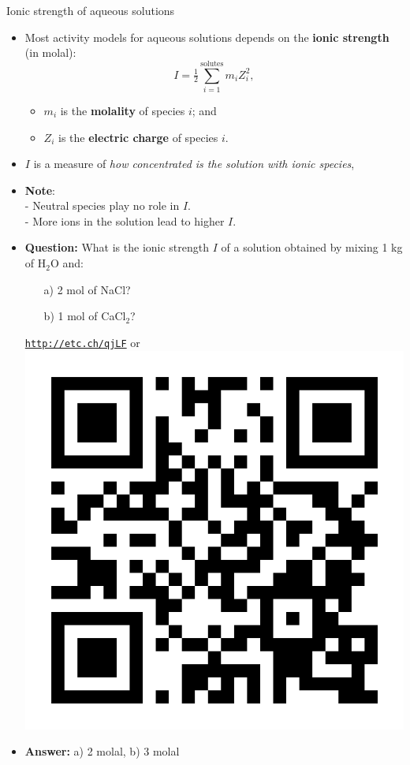 \begin{frame}{Ionic strength of aqueous solutions}
%
\lcol
\begin{itemize}
\item Most activity models for aqueous solutions depends on the  \alert{\textbf{ionic strength}} (in molal):
\[
\boxed{I=\tfrac{1}{2}\sum_{i=1}^{\text{solutes}}m_{i}Z_{i}^{2}},
\]
\begin{itemize}
\item $m_{i}$ is the \textbf{molality} of species $i$; and
\item $Z_{i}$ is the \textbf{electric charge }of species $i$.
\end{itemize}
\pause
\item $I$ is a measure of \emph{how concentrated is the solution with ionic
species}, 
\item \textbf{Note}: \\
\quad - \alert{Neutral species} play no role in $I$.\\
\quad - \alert{More ions} in the solution lead to higher $I$.\\
\end{itemize}
\rcol
\begin{itemize}
	\pause
\item \alert{\textbf{Question:}} What is the ionic strength $I$ of a solution obtained
by mixing 1 kg of H$_{2}$O and:
\begin{itemize}
\item[a)] 2 mol of NaCl?
\item[b)] 1 mol of CaCl$_{2}$?
\end{itemize}
\vskip 5pt
\begin{center}
\href{http://etc.ch/qjLF}{\textcolor{indigo(dye)}{\tt http://etc.ch/qjLF}} or 
\includegraphics[height=0.45\columnwidth]{figures/activity-models/poll-ionic-strength.png}
\end{center}
\hiddenpause
\item \textbf{Answer:}
a) 2 molal, 
b) 3 molal
\end{itemize}
\ecol
\end{frame}

